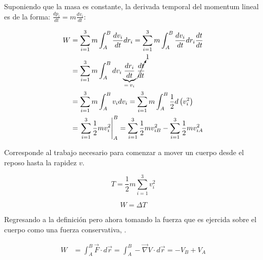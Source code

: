\documentclass[/home/hernan/Documentos/Apuntes_mecanica_teorica/main.tex]{subfiles}
\begin{document}
	Suponiendo que la masa es constante, la derivada temporal del momentum lineal es de la forma: $\frac{d p_{i}}{dt} = m \frac{d v_{i}}{dt}$:

	\begin{align*}
		W & =  \sum_{i=1}^{3} m \int_{A}^{B} \frac{d v_{i}}{dt}dr_{i} =  \sum_{i=1}^{3} m \int_{A}^{B} \frac{d v_{i}}{dt}dr_{i} \frac{dt}{dt}\\ 
		& = \sum_{i=1}^{3} m \int_{A}^{B} d v_{i} \underbrace{\frac{d r_{i}}{dt}}_{= \: v_{i}} \cancelto{1}{\frac{dt}{dt}}\\
		& = \sum_{i=1}^{3} m \int_{A}^{B}  v_{i} d v_{i} =  \sum_{i=1}^{3} m \int_{A}^{B} \frac{1}{2} d \left(v_{i}^{2}\right)\\
		& = \left . \sum_{i=1}^{3} \frac{1}{2} m v_{i}^{2} \right|_{A} ^{B} = \sum_{i=1}^{3} \frac{1}{2} m v_{iB}^{2} - \sum_{i=1}^{3} \frac{1}{2} m v_{iA}^{2}
	\end{align*}

	\begin{definition} Corresponde al trabajo necesario para comenzar a mover un cuerpo desde el reposo hasta la rapidez $v$.

		\begin{equation} 
			T =  \frac{1}{2} m \sum_{i=1}^{3} v_{i}^{2}
			\label{eq: Ttras}
		\end{equation}
	\end{definition}

	\begin{theorem}

		\begin{equation}
			W = \Delta T
			\label{eq: workT}
		\end{equation}
		
	\end{theorem}

	Regresando a la definición  pero ahora tomando la fuerza que es ejercida sobre el cuerpo como una fuerza conservativa, .

	\begin{align*}
		W &= \int_{A}^{B} \vec{F} \cdot d\vec{r} =  \int_{A}^{B} - \vec{\nabla}V \cdot d\vec{r} = -V_{B} + V_{A}
	\end{align*}
\end{document}
